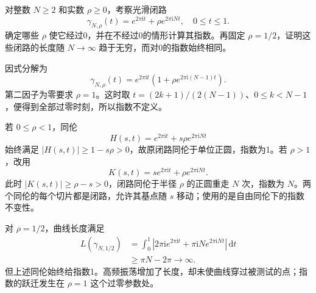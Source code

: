 \begin{exercise}\label{b3:ex:10-2}
对整数 \(N\ge2\) 和实数 \(\rho\ge0\)，考察光滑闭路
\[
 \gamma_{N,\rho}(t)=e^{2\pi\mathrm i t}+\rho e^{2\pi\mathrm iNt},
 \quad 0\le t\le1.
\]
确定哪些 \(\rho\) 使它经过0，并在不经过0的情形计算其指数。再固定 \(\rho=1/2\)，证明这些闭路的长度随 \(N\to\infty\) 趋于无穷，而对0的指数始终相同。
\end{exercise}
\begin{solution}
因式分解为
\[
 \gamma_{N,\rho}(t)
 =e^{2\pi\mathrm i t}\left(1+\rho e^{2\pi\mathrm i(N-1)t}\right).
\]
第二因子为零要求 \(\rho=1\)。这时取 \(t=(2k+1)/(2(N-1))\)、\(0\le k<N-1\)，便得到全部过零时刻，所以指数不定义。

若 \(0\le\rho<1\)，同伦
\[
 H(s,t)=e^{2\pi\mathrm i t}+s\rho e^{2\pi\mathrm iNt}
\]
始终满足 \(|H(s,t)|\ge1-s\rho>0\)，故原闭路同伦于单位正圆，指数为1。若 \(\rho>1\)，改用
\[
 K(s,t)=s e^{2\pi\mathrm i t}+\rho e^{2\pi\mathrm iNt}.
\]
此时 \(|K(s,t)|\ge\rho-s>0\)，闭路同伦于半径 \(\rho\) 的正圆重走 \(N\) 次，指数为 \(N\)。两个同伦的每个切片都是闭路，允许其基点随 \(s\) 移动；使用的是自由同伦下的指数不变性。

对 \(\rho=1/2\)，曲线长度满足
\[
 \begin{aligned}
 L(\gamma_{N,1/2})
 &=\int_0^1\left|2\pi\mathrm i e^{2\pi\mathrm i t}
           +\pi\mathrm iN e^{2\pi\mathrm iNt}\right|\,\mathrm dt\\
 &\ge\pi N-2\pi\longrightarrow\infty.
 \end{aligned}
\]
但上述同伦始终给指数1。高频振荡增加了长度，却未使曲线穿过被测试的点；指数的跃迁发生在 \(\rho=1\) 这个过零参数处。
\end{solution}

